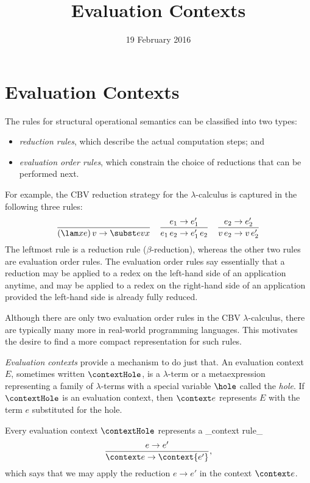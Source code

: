 \title{Evaluation Contexts}
\date{19 February 2016}
\maketitle

\section{Evaluation Contexts}

The rules for structural operational semantics can be classified into two types:
\begin{itemize}
\item
\emph{reduction rules}, which describe the actual computation steps; and
\item
\emph{evaluation order rules}, which constrain the choice of reductions that can be performed next.
\end{itemize}

For example, the CBV reduction strategy for the $\lambda$-calculus is captured in the following three rules:
\begin{align}
 \frac{}{(\lam xe)\,v \rightarrow \subst evx} &&
 \frac{e_1 \rightarrow e'_1}{e_1\,e_2 \rightarrow e'_1\,e_2} &&
 \frac{e_2 \rightarrow e'_2}{v\,e_2 \rightarrow v\,e'_2}\label{eqn:rule2}
\end{align}
The leftmost rule is a reduction rule ($\beta$-reduction), whereas the other two rules are evaluation order rules. The evaluation order rules say essentially that a reduction may be applied to a redex on the left-hand side of an application anytime, and may be applied to a redex on the right-hand side of an application provided the left-hand side is already fully reduced.

Although there are only two evaluation order rules in the CBV $\lambda$-calculus, there are typically many more in real-world programming languages. This motivates the desire to find a more compact representation for such rules. 

\emph{Evaluation contexts} provide a mechanism to do just that. An evaluation context $E$, sometimes written $\contextHole$, is a $\lambda$-term or a metaexpression representing a family of $\lambda$-terms with a special variable $\hole$ called the \emph{hole}. If $\contextHole$ is an evaluation context, then $\context e$ represents $E$ with the term $e$ substituted for the hole.

Every evaluation context $\contextHole$ represents a _context rule_
\[
 \frac{e \rightarrow e'}{\context e \rightarrow \context{e'}},
\]
which says that we may apply the reduction $e\rightarrow e'$ in the context $\context e$.

